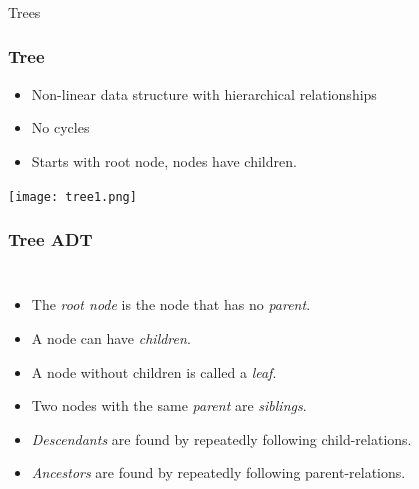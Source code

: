 \begin{frame}[fragile]\frametitle{}
\begin{center}
{\Large Trees}
\end{center}

\end{frame}

\begin{frame}
	\frametitle{Tree}
		\begin{itemize}
		\item Non-linear data structure with hierarchical relationships
		\item No cycles
		\item Starts with root node, nodes have children.
		\end{itemize}
		
\begin{center}
\texttt{[image: tree1.png]}
\end{center}

\end{frame}



\begin{frame}
	\frametitle{Tree ADT}
	\begin{columns}[T]
		\begin{itemize}
			\item The \textit{root node} is the node that has no \textit{parent}.
				
			\item A node can have \textit{children}.
				
			\item A node without children is called a \textit{leaf}.
				
			\item Two nodes with the same \textit{parent} are \textit{siblings}.
				
			\item \textit{Descendants} are found by repeatedly following child-relations.
				
			\item \textit{Ancestors} are found by repeatedly following parent-relations.
		\end{itemize}
	\end{columns}
\end{frame}

